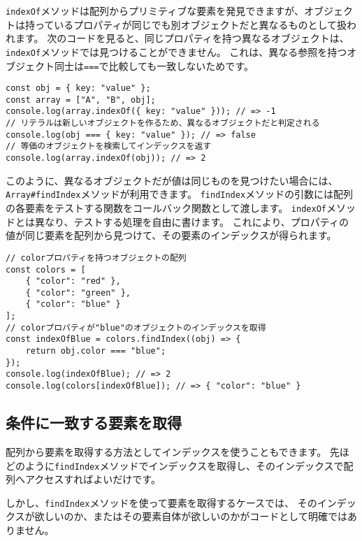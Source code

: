 \texttt{indexOf}メソッドは配列からプリミティブな要素を発見できますが、オブジェクトは持っているプロパティが同じでも別オブジェクトだと異なるものとして扱われます。
次のコードを見ると、同じプロパティを持つ異なるオブジェクトは、\texttt{indexOf}メソッドでは見つけることができません。
これは、異なる参照を持つオブジェクト同士は\texttt{===}で比較しても一致しないためです。

\begin{lstlisting}
const obj = { key: "value" };
const array = ["A", "B", obj];
console.log(array.indexOf({ key: "value" })); // => -1
// リテラルは新しいオブジェクトを作るため、異なるオブジェクトだと判定される
console.log(obj === { key: "value" }); // => false
// 等価のオブジェクトを検索してインデックスを返す
console.log(array.indexOf(obj)); // => 2
\end{lstlisting}

このように、異なるオブジェクトだが値は同じものを見つけたい場合には、\texttt{Array\#findIndex}メソッドが利用できます。
\texttt{findIndex}メソッドの引数には配列の各要素をテストする関数をコールバック関数として渡します。
\texttt{indexOf}メソッドとは異なり、テストする処理を自由に書けます。
これにより、プロパティの値が同じ要素を配列から見つけて、その要素のインデックスが得られます。

\begin{lstlisting}
// colorプロパティを持つオブジェクトの配列
const colors = [
    { "color": "red" },
    { "color": "green" },
    { "color": "blue" }
];
// colorプロパティが"blue"のオブジェクトのインデックスを取得
const indexOfBlue = colors.findIndex((obj) => {
    return obj.color === "blue";
});
console.log(indexOfBlue); // => 2
console.log(colors[indexOfBlue]); // => { "color": "blue" }
\end{lstlisting}

\hypertarget{find}{%
\subsection{条件に一致する要素を取得}\label{find}}

配列から要素を取得する方法としてインデックスを使うこともできます。
先ほどのように\texttt{findIndex}メソッドでインデックスを取得し、そのインデックスで配列へアクセスすればよいだけです。

しかし、\texttt{findIndex}メソッドを使って要素を取得するケースでは、
そのインデックスが欲しいのか、またはその要素自体が欲しいのかがコードとして明確ではありません。

